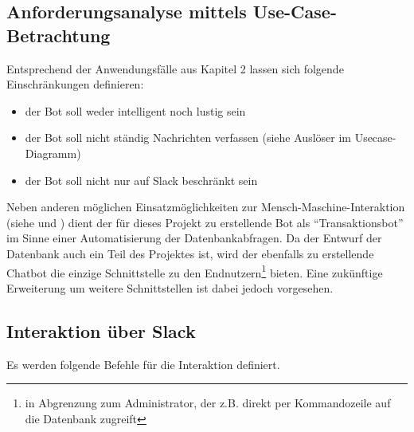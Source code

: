 \subsection{Anforderungsanalyse mittels Use-Case-Betrachtung}

Entsprechend der Anwendungsfälle aus Kapitel 2 lassen sich folgende Einschränkungen definieren:

\begin{itemize}
    \item der Bot soll weder intelligent noch lustig sein
    \item der Bot soll nicht ständig Nachrichten verfassen (siehe Auslöser im Usecase-Diagramm)
    \item der Bot soll nicht nur auf Slack beschränkt sein
\end{itemize}

Neben anderen möglichen Einsatzmöglichkeiten zur Mensch-Maschine-Interaktion (siehe \cite{PanConversationalInterfacesFuture2017} und \cite{GruensteinConversationalInterfaces2009}) dient der für dieses Projekt zu erstellende Bot als \enquote{Transaktionsbot} im Sinne einer Automatisierung der Datenbankabfragen. Da der Entwurf der Datenbank auch ein Teil des Projektes ist, wird der ebenfalls zu erstellende Chatbot die einzige Schnittstelle zu den Endnutzern\footnote{in Abgrenzung zum Administrator, der z.B. direkt per Kommandozeile auf die Datenbank zugreift} bieten. Eine zukünftige Erweiterung um weitere Schnittstellen ist dabei jedoch vorgesehen.

\subsection{Interaktion über Slack}

Es werden folgende Befehle für die Interaktion definiert.

